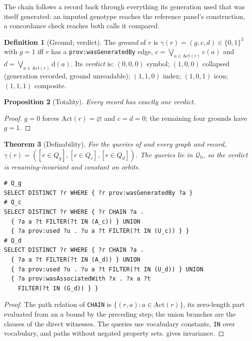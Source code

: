 \documentclass[11pt,twocolumn,a4paper]{article}
\theoremstyle{plain}
\newtheorem{theorem}{Theorem}[section]
\newtheorem{proposition}[theorem]{Proposition}
\theoremstyle{definition}
\newtheorem{definition}[theorem]{Definition}
\theoremstyle{remark}
\newcommand{\Qfrag}{\mathcal{Q}_{\mathrm{b}}}
\newcommand{\Act}{\mathrm{Act}}
\newcommand{\gr}{\gamma}
\newcommand{\vsym}{\textsf{symbol}}
\newcommand{\vcol}{\textsf{collapsed}}
\newcommand{\vind}{\textsf{index}}
\newcommand{\vico}{\textsf{icon}}
\newcommand{\vcom}{\textsf{composite}}
\newcommand{\genby}{\texttt{prov:wasGeneratedBy}}
\begin{document}
The chain follows a record back through everything its generation used that
was itself generated: an imputed genotype reaches the reference panel's
construction, a concordance check reaches both calls it compared.

\begin{definition}[Ground; verdict]
\label{def:verdict}
The \emph{ground} of $r$ is $\gr(r)=(g,c,d)\in\{0,1\}^3$ with $g=1$ iff $r$ has
a \genby{} edge, $c=\bigvee_{a\in\Act(r)}\mathrm c(a)$ and
$d=\bigvee_{a\in\Act(r)}\mathrm d(a)$. Its \emph{verdict} is:
$(0,0,0)$ \vsym; $(1,0,0)$ \vcol{} (generation recorded, ground unreadable);
$(1,1,0)$ \vind; $(1,0,1)$ \vico; $(1,1,1)$ \vcom.
\end{definition}

\begin{proposition}[Totality]
\label{prop:total}
Every record has exactly one verdict.
\end{proposition}

\begin{proof}
$g=0$ forces $\Act(r)=\varnothing$ and $c=d=0$; the remaining four grounds have
$g=1$.
\end{proof}

\begin{theorem}[Definability]
\label{thm:definable}
For the queries of  and every graph and record,
$\gr(r)=([r\in Q_g],[r\in Q_c],[r\in Q_d])$. The queries lie in $\Qfrag$, so the
verdict is renaming-invariant and constant on orbits.
\end{theorem}

\begin{lstlisting}[style=ttl,caption={The three verdict queries. \texttt{CHAIN} abbreviates the path of \Cref{def:chain}; the \texttt{IN} sets are the classes of \Cref{def:witness}.},label={lst:verdict}]
# Q_g
SELECT DISTINCT ?r WHERE { ?r prov:wasGeneratedBy ?a }
# Q_c
SELECT DISTINCT ?r WHERE { ?r CHAIN ?a .
  { ?a a ?t FILTER(?t IN (A_c)) } UNION
  { ?a prov:used ?u . ?u a ?t FILTER(?t IN (U_c)) } }
# Q_d
SELECT DISTINCT ?r WHERE { ?r CHAIN ?a .
  { ?a a ?t FILTER(?t IN (A_d)) } UNION
  { ?a prov:used ?u . ?u a ?t FILTER(?t IN (U_d)) } UNION
  { ?a prov:wasAssociatedWith ?x . ?x a ?t
    FILTER(?t IN (G_d)) } }
\end{lstlisting}

\begin{proof}
The path relation of \texttt{CHAIN} is $\{(r,a):a\in\Act(r)\}$, its zero-length
part evaluated from an $a$ bound by the preceding step; the union branches are
the clauses of the direct witnesses. The queries use vocabulary constants,
\texttt{IN} over vocabulary, and paths without negated property sets.
 gives invariance.
\end{proof}
\end{document}
